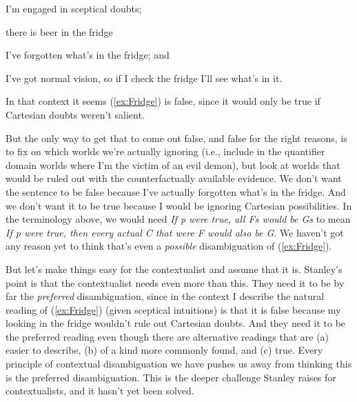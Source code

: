 \begin{itemize*}
\item I'm engaged in sceptical doubts;
\item there is beer in the fridge
\item I've forgotten what's in the fridge; and
\item I've got normal vision, so if I check the fridge I'll see what's in it.
\end{itemize*}

\noindent In that context it seems (\ref{ex:Fridge}) is false, since it would only be true if Cartesian doubts weren't salient.


\noindent But the only way to get that to come out false, and false for the right reasons, is to fix on which worlds we're actually ignoring (i.e., include in the quantifier domain worlds where I'm the victim of an evil demon), but look at worlds that would be ruled out with the counterfactually available evidence. We don't want the sentence to be false because I've actually forgotten what's in the fridge. And we don't want it to be true because I would be ignoring Cartesian possibilities. In the terminology above, we would need \textit{If p were true, all Fs would be Gs} to mean \textit{If p were true, then every actual C that were F would also be G}. We haven't got any reason yet to think that's even a \textit{possible} disambiguation of (\ref{ex:Fridge}). 

But let's make things easy for the contextualist and assume that it is. Stanley's point is that the contextualist needs even more than this. They need it to be by far the  \textit{preferred} disambiguation, since in the context I describe the natural reading of (\ref{ex:Fridge}) (given sceptical intuitions) is that it is false because my looking in the fridge wouldn't rule out Cartesian doubts. And they need it to be the preferred reading even though there are alternative readings that are (a) easier to describe, (b) of a kind more commonly found, and (c) true. Every principle of contextual disambiguation we have pushes us away from thinking this is the preferred disambiguation. This is the deeper challenge Stanley raises for contextualists, and it hasn't yet been solved.